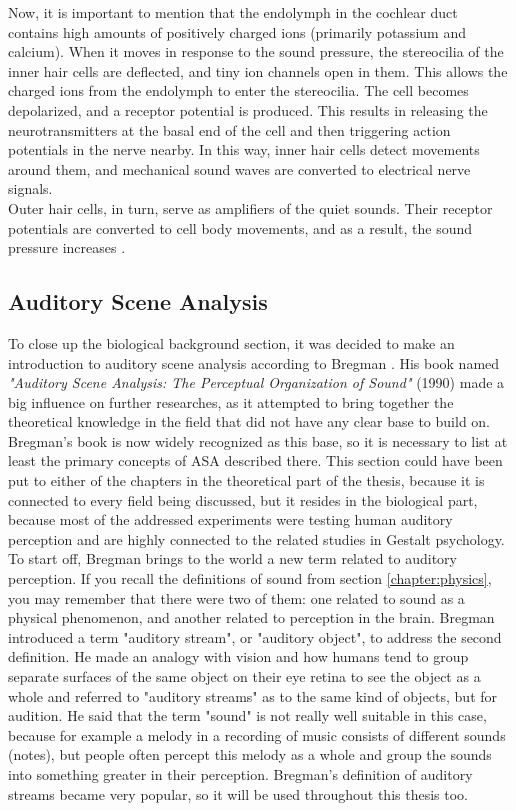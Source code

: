 Now, it is important to mention that the endolymph in the cochlear duct contains high amounts of positively charged ions (primarily potassium and calcium). When it moves in response to the sound pressure, the stereocilia of the inner hair cells are deflected, and tiny ion channels open in them. This allows the charged ions from the endolymph to enter the stereocilia. The cell becomes depolarized, and a receptor potential is produced. This results in releasing the neurotransmitters at the basal end of the cell and then triggering action potentials in the nerve nearby. In this way, inner hair cells detect movements around them, and mechanical sound waves are converted to electrical nerve signals.\\

Outer hair cells, in turn, serve as amplifiers of the quiet sounds. Their receptor potentials are converted to cell body movements, and as a result, the sound pressure increases \cite{Hudspeth2008}.

\subsection{Auditory Scene Analysis}\label{section:biology_asa}

To close up the biological background section, it was decided to make an introduction to auditory scene analysis according to Bregman \cite{Bregman1990}. His book named \textit{"Auditory Scene Analysis: The Perceptual Organization of Sound"} (1990) made a big influence on further researches, as it attempted to bring together the theoretical knowledge in the field that did not have any clear base to build on. Bregman's book is now widely recognized as this base, so it is necessary to list at least the primary concepts of ASA described there. This section could have been put to either of the chapters in the theoretical part of the thesis, because it is connected to every field being discussed, but it resides in the biological part, because most of the addressed experiments were testing human auditory perception and are highly connected to the related studies in Gestalt psychology.\\

To start off, Bregman brings to the world a new term related to auditory perception. If you recall the definitions of sound from section \ref{chapter:physics}, you may remember that there were two of them: one related to sound as a physical phenomenon, and another related to perception in the brain. Bregman introduced a term "auditory stream", or "auditory object", to address the second definition. He made an analogy with vision and how humans tend to group separate surfaces of the same object on their eye retina to see the object as a whole and referred to "auditory streams" as to the same kind of objects, but for audition. He said that the term "sound" is not really well suitable in this case, because for example a melody in a recording of music consists of different sounds (notes), but people often percept this melody as a whole and group the sounds into something greater in their perception. Bregman's definition of auditory streams became very popular, so it will be used throughout this thesis too.\\

